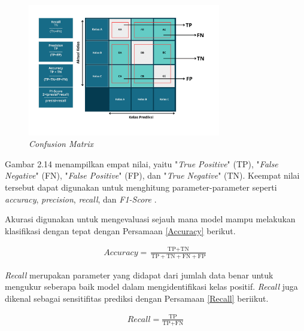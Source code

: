     \begin{figure}[H]
      \centering
      \includegraphics[width=0.75\textwidth]{figures/bab2/confusion matriks.png}
      \caption{\textit{Confusion Matrix}}
      \label{Confusion Matrix}
    
    \end{figure}

    Gambar 2.14 menampilkan empat nilai, yaitu "\textit{True Positive}" (TP), "\textit{False Negative}" (FN), "\textit{False Positive}" (FP), dan "\textit{True Negative}" (TN). Keempat nilai tersebut dapat digunakan untuk menghitung parameter-parameter seperti \textit{accuracy}, \textit{precision}, \textit{recall}, dan \textit{F1-Score} \cite{Nurhikmat2018}.

     Akurasi digunakan untuk mengevaluasi sejauh mana model mampu melakukan klasifikasi dengan tepat dengan Persamaan \ref{Accuracy} berikut. 
     
    \begin{equation}
        \begin{aligned}
            \textit{Accuracy} = \frac{\text{TP} + \text{TN}}{\text{TP} + \text{TN} + \text{FN} + \text{FP}}
        \end{aligned}\label{Accuracy}
    \end{equation}


    \textit{Recall} merupakan parameter yang didapat dari jumlah data benar untuk mengukur seberapa baik model dalam mengidentifikasi kelas positif. \textit{Recall} juga dikenal sebagai sensitifitas prediksi dengan Persamaan \ref{Recall} beriikut.

    
    \begin{equation} 
        \begin{aligned}
            \textit{Recall} = \frac{\text{TP}}{\text{TP} + \text{FN}} 
        \end{aligned}\label{Recall}
    \end{equation}

